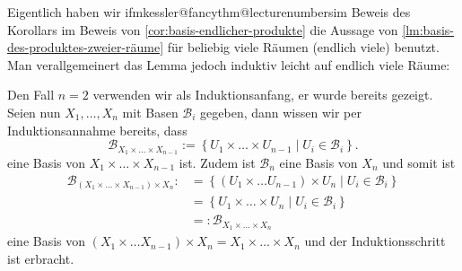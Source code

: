 \begin{remark*}
    Eigentlich haben wir \csname ifmkessler@fancythm@lecturenumbers\endcsname im Beweis des Korollars \else im Beweis von \autoref{cor:basis-endlicher-produkte} \fi die Aussage von \autoref{lm:basis-des-produktes-zweier-räume} für beliebig viele Räumen (endlich viele) benutzt. Man verallgemeinert das Lemma jedoch induktiv leicht auf endlich viele Räume:

\end{remark*}
\begin{proof*}
    Den Fall $n=2$ verwenden wir als Induktionsanfang, er wurde bereits gezeigt. Seien nun $X_1,\ldots,X_n$ mit Basen $\mathcal{B}_i$ gegeben, dann wissen wir per Induktionsannahme bereits, dass 
    \[
    \mathcal{B}_{X_1\times \ldots\times X_{n-1}} := \left \{U_1\times \ldots\times U_{n-1}\mid U_i \in \mathcal{B}_i\right\} 
    .\] 
    eine Basis von $X_1\times \ldots\times X_{n-1}$ ist. Zudem ist $\mathcal{B}_n$ eine Basis von $X_n$ und somit ist
\[
    \begin{split}
        \mathcal{B}_{(X_1\times \ldots\times X_{n-1})\times X_n}:&= \left \{(U_1\times \ldots U_{n-1})\times U_n \mid  U_i \in \mathcal{B}_i\right\} \\
                                                                 &=\left \{U_1\times \ldots\times U_n \mid  U_i \in \mathcal{B}_i\right\} \\
                                                                 &=: \mathcal{B}_{X_1\times \ldots\times X_n}
    \end{split}
\]
eine Basis von $(X_1\times \ldots X_{n-1})\times X_n = X_1\times \ldots\times X_n$ und der Induktionsschritt ist erbracht.
\end{proof*}

